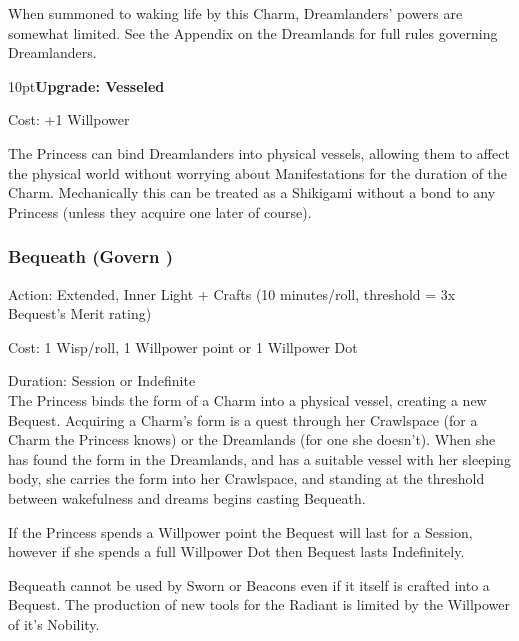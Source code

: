 When summoned to waking life by this Charm, Dreamlanders' powers are somewhat limited. See the Appendix on the Dreamlands for full rules governing Dreamlanders. 

\begin{myindentpar}{10pt}\textbf{Upgrade: Vesseled}

\noindent Cost: +1 Willpower

The Princess can bind Dreamlanders into physical vessels, allowing them to affect the physical world without worrying about Manifestations for the duration of the Charm. Mechanically this can be treated as a Shikigami without a bond to any Princess (unless they acquire one later of course).

\end{myindentpar}

\subsubsection*{Bequeath (Govern \textbullet\textbullet\textbullet)}

\noindent Action: Extended, Inner Light + Crafts (10 minutes/roll, threshold = 3x Bequest's Merit rating)

\noindent Cost: 1 Wisp/roll, 1 Willpower point or 1 Willpower Dot

\noindent Duration: Session or Indefinite \\

\noindent The Princess binds the form of a Charm into a physical vessel, creating a new Bequest. Acquiring a Charm's form is a quest through her Crawlspace (for a Charm the Princess knows) or the Dreamlands (for one she doesn't). When she has found the form in the Dreamlands, and has a suitable vessel with her sleeping body, she carries the form into her Crawlspace, and standing at the threshold between wakefulness and dreams begins casting Bequeath.

If the Princess spends a Willpower point the Bequest will last for a Session, however if she spends a full Willpower Dot then Bequest lasts Indefinitely. 

Bequeath cannot be used by Sworn or Beacons even if it itself is crafted into a Bequest. The production of new tools for the Radiant is limited by the Willpower of it's Nobility. 

